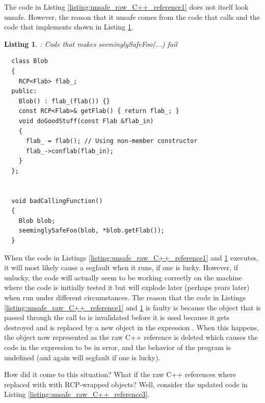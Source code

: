 \documentclass[pdf,ps2pdf,11pt]{SANDreport}
\newtheorem{listing}{Listing}
\begin{document}
The code in Listing {}\ref{listing:unsafe_raw_C++_reference1} does not
itself look unsafe.  However, the reason that it unsafe comes from the
code that calls {} and the code that
implements {} shown in Listing
{}\ref{listing:unsafe_raw_C++_reference2}.

\begin{listing}: Code that makes seeminglySafeFoo(...) fail\\
\label{listing:unsafe_raw_C++_reference2}
{\small\begin{verbatim}
  class Blob
  {
    RCP<Flab> flab_;
  public:
    Blob() : flab_(flab()) {}
    const RCP<Flab>& getFlab() { return flab_; }
    void doGoodStuff(const Flab &flab_in)
    {
      flab_ = flab(); // Using non-member constructor
      flab_->conflab(flab_in);
    }
  };


  void badCallingFunction()
  {
    Blob blob;
    seeminglySafeFoo(blob, *blob.getFlab());
  }
\end{verbatim}}
\end{listing}

When the code in Listings {}\ref{listing:unsafe_raw_C++_reference1}
and {}\ref{listing:unsafe_raw_C++_reference2} executes, it will most
likely cause a segfault when it runs, if one is lucky.  However, if
unlucky, the code will actually seem to be working correctly on the
machine where the code is initially tested it but will explode later
(perhaps years later) when run under different circumstances.  The
reason that the code in Listings
{}\ref{listing:unsafe_raw_C++_reference1} and
{}\ref{listing:unsafe_raw_C++_reference2} is faulty is because the
{} object that is passed through the call
{} to
{} is invalidated before it is used
because it gets destroyed and is replaced by a new object in the
expression {}.  When this happens, the object now
represented as the raw C++ reference {} is deleted which
causes the code in the expression {} to
be in error, and the behavior of the program is undefined (and again
will segfault if one is lucky).

How did it come to this situation?  What if the raw C++ references
where replaced with with RCP-wrapped objects?  Well, consider the
updated code in Listing {}\ref{listing:unsafe_raw_C++_reference3}.
\end{document}
